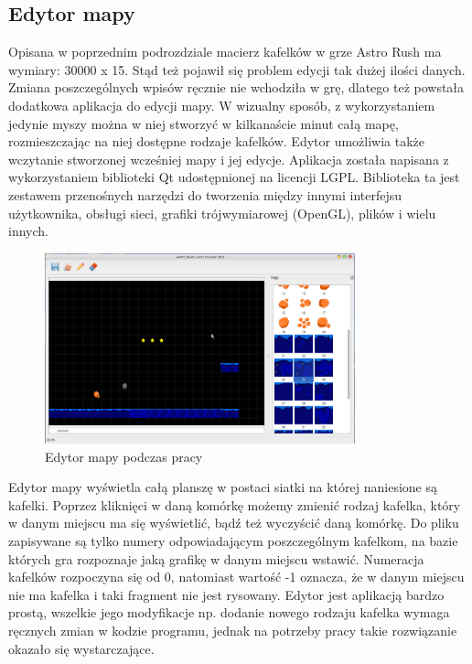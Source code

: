 \subsection{Edytor mapy}
Opisana w poprzednim podrozdziale macierz kafelków w grze Astro Rush ma wymiary: 30000 x 15. Stąd też pojawił się problem edycji tak dużej ilości danych. Zmiana poszczególnych wpisów ręcznie nie wchodziła w grę, dlatego też powstała dodatkowa aplikacja do edycji mapy. W wizualny sposób, z wykorzystaniem jedynie myszy można w niej stworzyć w kilkanaście minut całą mapę, rozmieszczając na niej dostępne rodzaje kafelków. Edytor umożliwia także wczytanie stworzonej wcześniej mapy i jej edycje. Aplikacja została napisana z wykorzystaniem biblioteki Qt udostępnionej na licencji LGPL. Biblioteka ta jest zestawem przenośnych narzędzi do tworzenia między innymi interfejsu użytkownika, obsługi sieci, grafiki trójwymiarowej (OpenGL), plików i wielu innych. 


\begin{figure}[h]
    \centering
    \includegraphics[width=0.8\textwidth,natwidth=800,natheight=160]{./Pictures/designer.png}
    \caption{Edytor mapy podczas pracy}
\end{figure}

Edytor mapy wyświetla całą planszę w postaci siatki na której naniesione są kafelki. Poprzez kliknięci w daną komórkę możemy zmienić rodzaj kafelka, który w danym miejscu ma się wyświetlić, bądź też wyczyścić daną komórkę. Do pliku zapisywane są tylko numery odpowiadającym poszczególnym kafelkom, na bazie których gra rozpoznaje jaką grafikę w danym miejscu wstawić. Numeracja kafelków rozpoczyna się od 0, natomiast wartość -1 oznacza, że w danym miejscu nie ma kafelka i taki fragment nie jest rysowany. Edytor jest aplikacją bardzo prostą, wszelkie jego modyfikacje np. dodanie nowego rodzaju kafelka wymaga ręcznych zmian w kodzie programu, jednak na potrzeby pracy takie rozwiązanie okazało się wystarczające.

